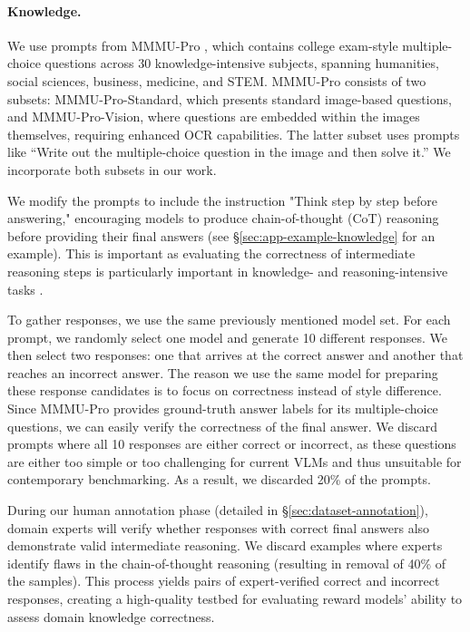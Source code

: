 \paragraph{Knowledge.}
We use prompts from MMMU-Pro \citep{yue2024mmmu}, which contains college exam-style multiple-choice questions across 30 knowledge-intensive subjects, spanning humanities, social sciences, business, medicine, and STEM. MMMU-Pro consists of two subsets: MMMU-Pro-Standard, which presents standard image-based questions, and MMMU-Pro-Vision, where questions are embedded within the images themselves, requiring enhanced OCR capabilities. The latter subset uses prompts like ``Write out the multiple-choice question in the image and then solve it.'' We incorporate both subsets in our work.

We modify the prompts to include the instruction "Think step by step before answering," encouraging models to produce chain-of-thought (CoT) reasoning \citep{wei2022chain, kojima2022large} before providing their final answers (see \S \ref{sec:app-example-knowledge} for an example). This is important as evaluating the correctness of intermediate reasoning steps is particularly important in knowledge- and reasoning-intensive tasks \citep{lightman2023let}.

To gather responses, we use the same previously mentioned model set. For each prompt, we randomly select one model and generate 10 different responses. We then select two responses: one that arrives at the correct answer and another that reaches an incorrect answer. The reason we use the same model for preparing these response candidates is to focus on correctness instead of style difference.
Since MMMU-Pro provides ground-truth answer labels for its multiple-choice questions, we can easily verify the correctness of the final answer. We discard prompts where all 10 responses are either correct or incorrect, as these questions are either too simple or too challenging for current VLMs and thus unsuitable for contemporary benchmarking. As a result, we discarded 20\% of the prompts.

During our human annotation phase (detailed in \S \ref{sec:dataset-annotation}), domain experts will verify whether responses with correct final answers also demonstrate valid intermediate reasoning. We discard examples where experts identify flaws in the chain-of-thought reasoning (resulting in removal of 40\% of the samples). This process yields pairs of expert-verified correct and incorrect responses, creating a high-quality testbed for evaluating reward models' ability to assess domain knowledge correctness.


